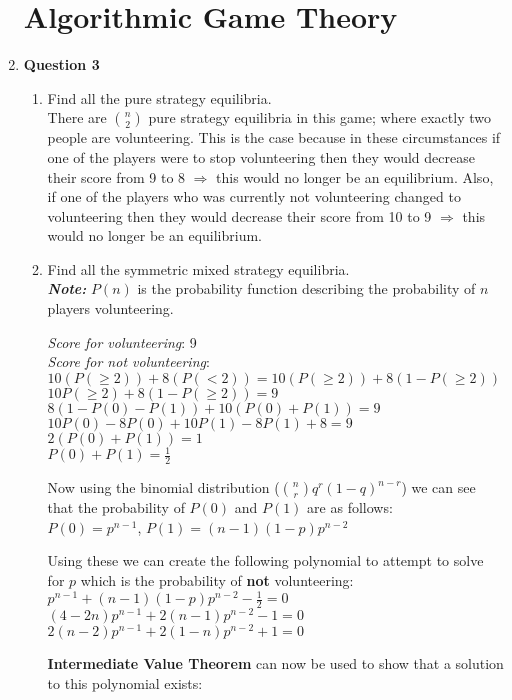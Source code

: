 \documentclass[12pt]{article}
\begin{document}
\begin{enumerate}
\section{Algorithmic Game Theory} 
\item \textbf{Question 3}
\begin{enumerate}
\item Find all the pure strategy equilibria. \\
There are $n \choose 2 $ pure strategy equilibria in this game; where exactly two people are volunteering. This is the case because in these circumstances if one of the players were to stop volunteering then they would decrease their score from 9 to 8 $\Rightarrow $ this would no longer be an equilibrium. Also, if one of the players who was currently not volunteering changed to volunteering then they would decrease their score from 10 to 9 $\Rightarrow $ this would no longer be an equilibrium.
\item Find all the symmetric mixed strategy equilibria. \\
\textit{\textbf{Note:}} $P(n)$ is the probability function describing the probability of $n$ players volunteering. \par
\textit{Score for volunteering}: 9\\
\textit{Score for not volunteering}:\\ $10(P(\geq 2)) + 8(P(<2)) = 10(P(\geq 2)) + 8(1-P(\geq 2))$ \\
$10P(\geq 2) + 8(1-P(\geq 2)) = 9$\\
$8(1-P(0)-P(1))+10(P(0)+P(1)) = 9$\\
$10P(0)-8P(0)+10P(1)-8P(1)+8 = 9$\\
$2(P(0)+P(1))=1$\\
$P(0)+P(1) = \frac{1}{2}$\par
Now using the binomial distribution (${n \choose r}q^r (1-q)^{n-r}$) we can see that the probability of $P(0)$ and $P(1)$ are as follows:\\
$P(0) = p^{n-1}$, $P(1)= (n-1)(1-p)p^{n-2} $\par
Using these we can create the following polynomial to attempt to solve for $p$ which is the probability of \textbf{not} volunteering:\\
$p^{n-1}+(n-1)(1-p)p^{n-2} -\frac{1}{2} = 0 $\\
$(4-2n)p^{n-1} + 2(n-1)p^{n-2} - 1 = 0$\\
$2(n-2)p^{n-1}+2(1-n)p^{n-2} +1 = 0$\par
\textbf{Intermediate Value Theorem} can now be used to show that a solution to this polynomial exists:\\

\end{enumerate}
\end{enumerate}
\end{document}
